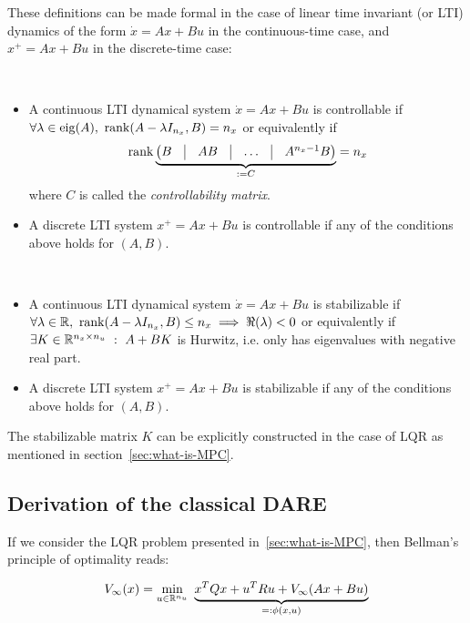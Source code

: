 \documentclass[12pt]{article}
\begin{document}
These definitions can be made formal in the case of linear time invariant (or LTI) dynamics of the form $\dot{x}=Ax+Bu$ in the continuous-time case, and $x^+=Ax+Bu$ in the discrete-time case:
\begin{definition}[Controllability]~
	\begin{itemize}[label=\textbullet]
		\item A continuous LTI dynamical system $\dot{x}=Ax+Bu$ is controllable if $\forall\lambda\in\mathrm{eig}(A),~\operatorname{rank}(A-\lambda I_{n_x},B)=n_x$ or equivalently if
		$$\rank\underbrace{\begin{pmatrix}B&\vline& AB&\vline&\ldots&\vline&A^{n_x-1}B\end{pmatrix}}_{:=C}=n_x$$
		where $C$ is called the \textit{controllability matrix}.

		\item A discrete LTI system $x^+=Ax+Bu$ is controllable if any of the conditions above holds for $(A,B)$.
	\end{itemize}
\end{definition}
\begin{definition}[Stabilizability]~
	\begin{itemize}[label=\textbullet]
		\item A continuous LTI dynamical system $\dot{x}=Ax+Bu$ is stabilizable if $\forall\lambda\in\mathbb{R},~\operatorname{rank}(A-\lambda I_{n_x},B)\leq n_x\implies \Re(\lambda)< 0$ or equivalently if $\exists K\in\mathbb{R}^{n_x\times n_u}~:~A+BK$ is Hurwitz, i.e. only has eigenvalues with negative real part.

		\item A discrete LTI system $x^+=Ax+Bu$ is stabilizable if any of the conditions above holds for $(A,B)$.
	\end{itemize}
\end{definition}

\begin{remark}
	The stabilizable matrix $K$ can be explicitly constructed in the case of LQR as mentioned in section~\ref{sec:what-is-MPC}.
\end{remark}

\subsection{Derivation of the classical DARE}\label{sec:DARE}

If we consider the LQR problem presented in~\ref{sec:what-is-MPC}, then Bellman's principle of optimality reads:

$$V_\infty(x)=\min_{u\in\mathbb{R}^{n_u}}~\underbrace{x^TQx+u^TRu+V_\infty(Ax+Bu)}_{=:\phi(x,u)}$$
\end{document}
